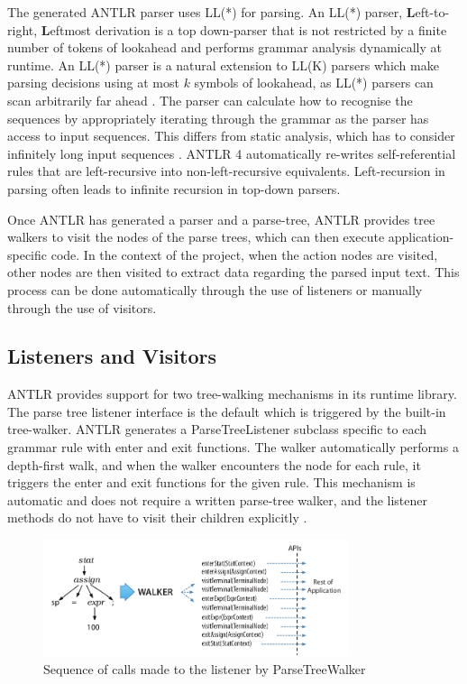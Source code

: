 The generated ANTLR parser uses LL(*) for parsing. An LL(*) parser, \textbf{L}eft-to-right, \textbf{L}eftmost derivation is a top down-parser that is not restricted by a finite number of tokens of lookahead and performs grammar analysis dynamically at runtime. An LL(*) parser is a natural extension to LL(K) parsers which make parsing decisions using at most $k$ symbols of lookahead, as LL(*) parsers can scan arbitrarily far ahead \cite{bovet2008antlrworks}. The parser can calculate how to recognise the sequences by appropriately iterating through the grammar as the parser has access to input sequences. This differs from static analysis, which has to consider infinitely long input sequences \cite{parr2011ll}. ANTLR 4 automatically re-writes self-referential rules that are left-recursive into non-left-recursive equivalents. Left-recursion in parsing often leads to infinite recursion in top-down parsers. \newline \par

Once ANTLR has generated a parser and a parse-tree, ANTLR provides tree walkers to visit the nodes of the parse trees, which can then execute application-specific code. In the context of the project, when the action nodes are visited, other nodes are then visited to extract data regarding the parsed input text. This process can be done automatically through the use of listeners or manually through the use of visitors.

\subsection{Listeners and Visitors}

ANTLR provides support for two tree-walking mechanisms in its runtime library. The parse tree listener interface is the default which is triggered by the built-in tree-walker. ANTLR generates a ParseTreeListener subclass specific to each grammar rule with enter and exit functions. The walker automatically performs a depth-first walk, and when the walker encounters the node for each rule, it triggers the enter and exit functions for the given rule. This mechanism is automatic and does not require a written parse-tree walker, and the listener methods do not have to visit their children explicitly \cite{parr2013definitive}.

\begin{figure}[!h]
  \centering
  \includegraphics[width=0.8\textwidth]{images/antlrlistener.png}
  \caption{Sequence of calls made to the listener by ParseTreeWalker \cite{parr2013definitive}}
\end{figure}

